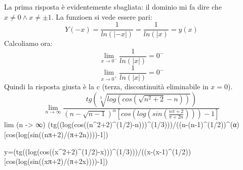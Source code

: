 La prima risposta è evidentemente sbagliata: il dominio mi fa dire che $x \neq 0 \land x \neq \pm 1$.
\newline
La funzioen si vede essere pari:
\[
    Y(-x) = \frac{1}{ln (|-x|)} = \frac{1}{ln (|x)} = y(x)
\]
Calcoliamo ora:
\[
    \lim_{x\rightarrow 0^-} \frac{1}{ln(|x|)} = 0^-
\]
\[
    \lim_{x\rightarrow 0^+} \frac{1}{ln(|x|)} = 0^-
\]
Quindi la risposta giusta è la c (terza, discontinuità eliminabile in $x=0$).
\[
    \lim_{n\rightarrow \infty} \frac
    {tg(\sqrt[3]{log(cos(\sqrt{n^2+2}-n))})}
    {(n-\sqrt{n-1})^{\alpha}[cos(log(sin(\frac{n\pi+2}{\pi+2n})))-1]}
\]
    lim (n -> ∞) (tg((log(cos((n^2+2)^(1/2)-n)))^(1/3)))/((n-(n-1)^(1/2))^(α)[cos(log(sin((nπ+2)/(π+2n))))-1])

    y=(tg((log(cos((x^2+2)^(1/2)-x)))^(1/3)))/((x-(x-1)^(1/2))[cos(log(sin((xπ+2)/(π+2x))))-1])
\newpage